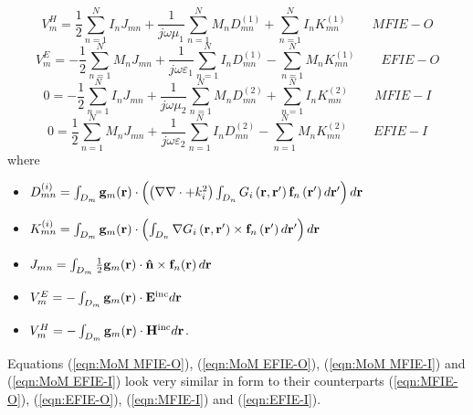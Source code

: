 \begin{equation}\label{eqn:MoM MFIE-O}
\boxed{V_m^H =  \frac{1}{2} \sum_{n=1}^N I_n J_{mn} + \frac{1}{j \omega \mu_1} \sum_{n=1}^{N} M_n D_{mn}^{(1)} + \sum_{n=1}^{N} I_n K_{mn}^{(1)}} \qquad MFIE-O 
\end{equation}
\begin{equation}\label{eqn:MoM EFIE-O}
\boxed{V_m^E =  -\frac{1}{2} \sum_{n=1}^N M_n J_{mn} + \frac{1}{j \omega \varepsilon_1} \sum_{n=1}^{N} I_n D_{mn}^{(1)} - \sum_{n=1}^{N} M_n K_{mn}^{(1)}} \qquad EFIE-O 
\end{equation}
\begin{equation}\label{eqn:MoM MFIE-I}
\boxed{0 =  -\frac{1}{2} \sum_{n=1}^N I_n J_{mn} + \frac{1}{j \omega \mu_2} \sum_{n=1}^{N} M_n D_{mn}^{(2)} + \sum_{n=1}^{N} I_n K_{mn}^{(2)}} \qquad MFIE-I
\end{equation}
\begin{equation}\label{eqn:MoM EFIE-I}
\boxed{0 =  \frac{1}{2} \sum_{n=1}^N M_n J_{mn} + \frac{1}{j \omega \varepsilon_2} \sum_{n=1}^{N} I_n D_{mn}^{(2)} - \sum_{n=1}^{N} M_n K_{mn}^{(2)}} \qquad EFIE-I 
\end{equation}
where
\begin{itemize}
\item $D_{mn}^{(i)} = \int_{D_m}\mathbf{g}_m \!\left(\mathbf{r}\right) \cdot \left( \left(\nabla \nabla \cdot + k_i^2\right) \int_{D_n} G_i\left(\mathbf{r}, \mathbf{r}'\right) \mathbf{f}_n\left(\mathbf{r}'\right) d\mathbf{r}' \right) d\mathbf{r}$
\item $K_{mn}^{(i)} = \int_{D_m} \mathbf{g}_m \!\left(\mathbf{r}\right) \cdot \left(\int_{D_n} \nabla G_i\left(\mathbf{r}, \mathbf{r}'\right) \times \mathbf{f}_n\left(\mathbf{r}'\right) d\mathbf{r}'\right) d\mathbf{r}$
\item $J_{mn} = \int_{D_m} \frac{1}{2} \mathbf{g}_m \!\left(\mathbf{r}\right) \cdot \mathbf{\hat{n}} \times \mathbf{f}_{n}\!\left(\mathbf{r}\right)d\mathbf{r}$
\item $V_m^{E} = -\int_{D_m}\mathbf{g}_m \!\left(\mathbf{r}\right) \cdot \mathbf{E}^\text{inc} d\mathbf{r}$
\item $V_m^{H} = -\int_{D_m}\mathbf{g}_m \!\left(\mathbf{r}\right) \cdot \mathbf{H}^\text{inc} d\mathbf{r}$.
\end{itemize}
%
\par
Equations (\ref{eqn:MoM MFIE-O}), (\ref{eqn:MoM EFIE-O}), (\ref{eqn:MoM MFIE-I}) and (\ref{eqn:MoM EFIE-I}) look very similar in form to their counterparts (\ref{eqn:MFIE-O}), (\ref{eqn:EFIE-O}), (\ref{eqn:MFIE-I}) and (\ref{eqn:EFIE-I}).


